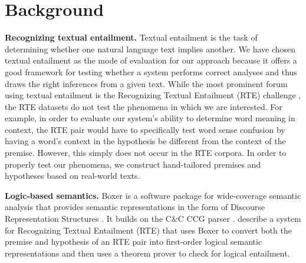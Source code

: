 \section{Background}

\textbf{Recognizing textual entailment.}
Textual entailment is the task of determining whether one natural language text
implies another.  We have chosen textual entailment as the mode of evaluation
for our approach because it offers a good framework for testing whether a system
performs correct analyses and thus draws the right inferences from a given text.
While the most prominent forum using textual entailment is the Recognizing
Textual Entailment (RTE) challenge \citep{dagan:rte2005}, the RTE datasets do
not test the phenomena in which we are interested. For example, in order to
evaluate our system's ability to determine word meaning in context, the RTE pair
would have to specifically test word sense confusion by having a word's context
in the hypothesis be different from the context of the premise.  However, this
simply does not occur in the RTE corpora.  In order to properly test our
phenomena, we construct hand-tailored premises and hypotheses based on
real-world texts.


\textbf{Logic-based semantics.}
Boxer \citep{bos:coling2004} is a software package for wide-coverage semantic
analysis that provides semantic representations in the form of Discourse
Representation Structures \citep{kamp:book93}. It builds on the C\&C CCG parser
\citep{clark:acl04}.
\citet{bos:emnlp2005} describe a system for Recognizing Textual Entailment
(RTE) that uses Boxer to convert both the premise and hypothesis of an RTE pair
into first-order logical semantic representations and then uses a theorem prover
to check for logical entailment. 


